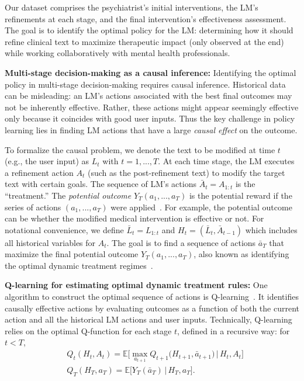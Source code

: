 \documentclass{article}
\begin{document}
Our dataset comprises the psychiatrist's initial interventions, the LM's refinements at each stage, and the final intervention's effectiveness assessment. The goal is to identify the optimal policy for the LM: determining how it should refine clinical text to maximize therapeutic impact (only observed at the end) while working collaboratively with mental health professionals.

\textbf{Multi-stage decision-making as a causal inference:} Identifying the optimal policy in multi-stage decision-making requires causal inference. Historical data can be misleading: an LM's actions associated with the best final outcomes may not be inherently effective. Rather, these actions might appear seemingly effective only because it coincides with good user inputs. Thus the key challenge in policy learning lies in finding LM actions that have a large \emph{causal effect} on the outcome. 

To formalize the causal problem, we denote the text to be modified at time $t$ (e.g., the user input) as $L_t$ with $t=1,..., T$. At each time stage, the LM executes a refinement action $A_t$ (such as the post-refinement text) to modify the target text with certain goals. The sequence of LM's actions $\bar{A}_t=A_{1:t}$ is the  ``treatment.'' The \emph{potential outcome} $Y_T(a_1,...,a_T)$ is the potential reward if the series of actions $(a_1,...,a_T)$ were applied~\cite{imbens2015causal,pearl2009causality,hernan2010causal}.
For example, the potential outcome can be whether the modified medical intervention is effective or not. For notational convenience, we define $\bar{L}_t = L_{1:t}$ and $H_t=(\bar{L}_t,\bar{A}_{t-1})$ which includes all historical variables for $A_t$. The goal is to find a sequence of actions $\bar{a}_T$ that maximize the final potential outcome $Y_T(a_1,...,a_T)$, also known as identifying the optimal dynamic treatment regimes~\citep{watkins1989learning,murphy2005generalization,sutton2018reinforcement}.



\textbf{Q-learning for estimating optimal dynamic treatment rules:} One algorithm to construct the optimal sequence of actions is Q-learning~\citep{watkins1989learning,murphy2005generalization,sutton2018reinforcement}. It identifies causally effective actions by evaluating outcomes as a function of both the current action and all the historical LM actions and user inputs. Technically, Q-learning relies on the optimal Q-function for each stage $t$, defined in a recursive way: for $t < T$,
\begin{align}
\nonumber
&Q_t(H_t, A_t) = \mathbb{E}\Big[ \max_{a_{t+1}} Q_{t+1}\big(H_{t+1}, \bar{a}_{t+1}\big) \,\Big|\, H_t, A_t \Big]\\
\nonumber
&Q_T(H_T, a_T) = \mathbb{E}\big[ Y_T(\bar{a}_T) \,\big|\, H_T, a_T \big].
\end{align}
\end{document}
